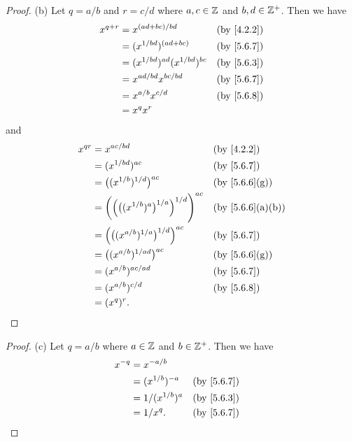 \begin{proof}{(b)}
  Let \(q = a / b\) and \(r = c / d\) where \(a, c \in \mathbb{Z}\) and \(b, d \in \mathbb{Z}^+\).
  Then we have
  \begin{align*}
    x^{q + r} & = x^{(ad + bc) / bd}                  &  & \by{4.2.2}                \\
              & = (x^{1 / bd})^{(ad + bc)}            &  & \by{5.6.7}                \\
              & = (x^{1 / bd})^{ad} (x^{1 / bd})^{bc} &  & \by{5.6.3}                \\
              & = x^{ad / bd} x^{bc / bd}             &  & \text{(by  \cref{5.6.7})} \\
              & = x^{a / b} x^{c / d}                 &  & \by{5.6.8}                \\
              & = x^q x^r
  \end{align*}
  and
  \begin{align*}
    x^{qr} & = x^{ac / bd}                                                        &  & \by{4.2.2}                     \\
           & = (x^{1 / bd})^{ac}                                                  &  & \by{5.6.7}                     \\
           & = \big((x^{1 / b})^{1 / d}\big)^{ac}                                 &  & \text{(by \cref{5.6.6}(g))}    \\
           & = \bigg(\Big(\big((x^{1 / b})^a\big)^{1 / a}\Big)^{1 / d}\Bigg)^{ac} &  & \text{(by \cref{5.6.6}(a)(b))} \\
           & = \Big(\big((x^{a / b})^{1 / a}\big)^{1 / d}\Big)^{ac}               &  & \by{5.6.7}                     \\
           & = \big((x^{a / b})^{1 / ad}\big)^{ac}                                &  & \text{(by \cref{5.6.6}(g))}    \\
           & = (x^{a / b})^{ac / ad}                                              &  & \by{5.6.7}                     \\
           & = (x^{a / b})^{c / d}                                                &  & \by{5.6.8}                     \\
           & = (x^q)^r.
  \end{align*}
\end{proof}

\begin{proof}{(c)}
  Let \(q = a / b\) where \(a \in \mathbb{Z}\) and \(b \in \mathbb{Z}^+\).
  Then we have
  \begin{align*}
    x^{-q} & = x^{-a / b}                        \\
           & = (x^{1 / b})^{-a}  &  & \by{5.6.7} \\
           & = 1 / (x^{1 / b})^a &  & \by{5.6.3} \\
           & = 1 / x^q.          &  & \by{5.6.7}
  \end{align*}
\end{proof}

